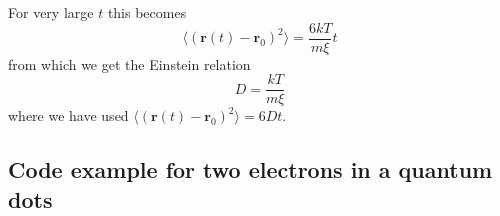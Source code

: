 \documentclass[%
oneside,                 %
final,                   %
10pt]{article}
\begin{document}
For very large $t$ this becomes
\[
\langle (\mathbf{r}(t)-\mathbf{r}_{0})^{2}\rangle =\frac{6kT}{m\xi }t 
\] 
from which we get the Einstein relation  
 \[ 
D= \frac{kT}{m\xi } 
\] 	
where we have used $\langle (\mathbf{r}(t)-\mathbf{r}_{0})^{2}\rangle =6Dt$.

\subsection*{Code example for two electrons in a quantum dots}
\end{document}
